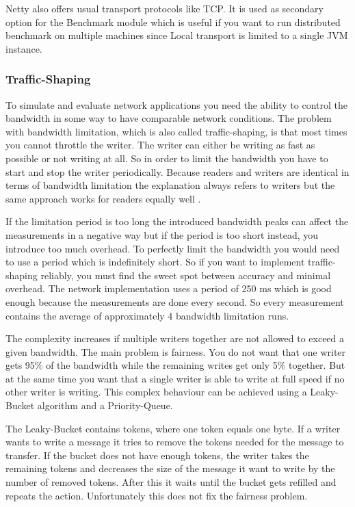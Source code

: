 Netty also offers usual transport protocols like TCP. It is used as secondary option for the Benchmark module which is useful if you want to run distributed benchmark on multiple machines since Local transport is limited to a single JVM instance.


\subsubsection{Traffic-Shaping}
To simulate and evaluate network applications you need the ability to control the bandwidth in some way to have comparable network conditions. The problem with bandwidth limitation, which is also called traffic-shaping, is that most times you cannot throttle the writer. The writer can either be writing as fast as possible or not writing at all. So in order to limit the bandwidth you have to start and stop the writer periodically. Because readers and writers are identical in terms of bandwidth limitation the explanation always refers to writers but the same approach works for readers equally well .

If the limitation period is too long the introduced bandwidth peaks can affect the measurements in a negative way but if the period is too short instead, you introduce too much overhead. To perfectly limit the bandwidth you would need to use a period which is indefinitely short. So if you want to implement traffic-shaping reliably, you must find the sweet spot between accuracy and minimal overhead. The network implementation uses a period of 250 ms which is good enough because the measurements are done every second. So every measurement contains the average of approximately 4 bandwidth limitation runs.

The complexity increases if multiple writers together are not allowed to exceed a given bandwidth. The main problem is fairness. You do not want that one writer gets 95\% of the bandwidth while the remaining writes get only 5\% together. But at the same time you want that a single writer is able to write at full speed if no other writer is writing. This complex behaviour can be achieved using a Leaky-Bucket algorithm and a Priority-Queue.

The Leaky-Bucket contains tokens, where one token equals one byte. If a writer wants to write a message it tries to remove the tokens needed for the message to transfer. If the bucket does not have enough tokens, the writer takes the remaining tokens and decreases the size of the message it want to write by the number of removed tokens. After this it waits until the bucket gets refilled and repeats the action. Unfortunately this does not fix the fairness problem.

